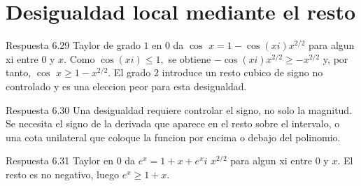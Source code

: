 \documentclass[10pt,a4paper,oneside,openany]{book}
\begin{document}
\section{Desigualdad local mediante el resto}
\begin{PSevenAnswerFixed}{Respuesta 6.29}
Taylor de grado \(1\) en \(0\) da \(\cos\) \(x=1-\cos(xi)x^{2/2}\) para algun xi entre \(0\) y \(x\). Como \(\cos(xi)\le 1,\) se obtiene \(-\cos(xi)x^{2/2}\ge -x^{2/2}\) y, por tanto, \(\cos\) \(x\ge 1-x^{2/2}\). El grado \(2\) introduce un resto cubico de signo no controlado y es una eleccion peor para esta desigualdad.
\end{PSevenAnswerFixed}
\begin{PSevenAnswerFixed}{Respuesta 6.30}
Una desigualdad requiere controlar el signo, no solo la magnitud. Se necesita el signo de la derivada que aparece en el resto sobre el intervalo, o una cota unilateral que coloque la funcion por encima o debajo del polinomio.
\end{PSevenAnswerFixed}
\begin{PSevenAnswerFixed}{Respuesta 6.31}
Taylor en \(0\) da \(e^x=1+x+e^xi\) \(x^{2/2}\) para algun xi entre \(0\) y \(x\). El resto es no negativo, luego \(e^x\ge 1+x\).
\end{PSevenAnswerFixed}
\end{document}
